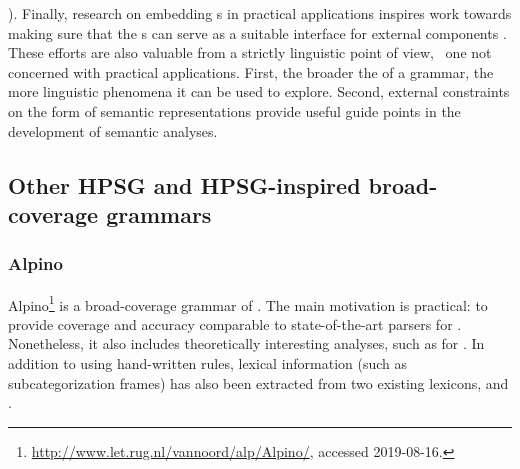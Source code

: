 \documentclass[output=paper,biblatex,babelshorthands,newtxmath,draftmode,colorlinks,citecolor=brown]{langscibook}
\begin{document}
\citealt[e.g.,][]{Velldal:09}). Finally, research on embedding s in
practical applications inspires work towards making sure that the s can serve as a suitable interface for external components
\citep[e.g.,][]{flickinger2005sem}.
These efforts are also valuable from a strictly linguistic point of view, \ie\ one not concerned with practical applications.  First, the broader the  of a grammar, the more linguistic phenomena it can be used to explore.  Second, external constraints on the form of semantic representations provide useful guide points in the development of semantic analyses.%
%


\subsection{Other HPSG and HPSG-inspired broad-coverage grammars}
\label{cl:othergrammars}

\subsubsection{Alpino}
\label{cl:other:alpino}

%
Alpino\footnote{%
	\url{http://www.let.rug.nl/vannoord/alp/Alpino/}, accessed 2019-08-16.
}
is a broad-coverage grammar of 
\citep{BvNM2001a-u,vannoord2005alpino,vannoord2006alpino}.
The main motivation is practical: to provide coverage and accuracy
comparable to state-of-the-art parsers for .
Nonetheless, it also includes theoretically interesting analyses,
such as for  \citep{BvN98a}.
In addition to using hand-written rules,
lexical information (such as subcategorization frames) has also been extracted from two existing lexicons,
 \citep{baayen1995celex}
and  \citep{kruyt1997parole}.
\end{document}
